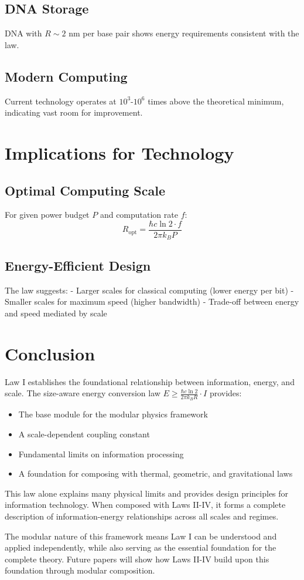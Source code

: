 \documentclass[11pt,a4paper]{article}
\theoremstyle{definition}
\begin{document}
\subsection{DNA Storage}
DNA with $R \sim 2$ nm per base pair shows energy requirements consistent with the law.

\subsection{Modern Computing}
Current technology operates at $10^3$-$10^6$ times above the theoretical minimum, indicating vast room for improvement.

\section{Implications for Technology}

\subsection{Optimal Computing Scale}

For given power budget $P$ and computation rate $f$:
\begin{equation}
R_{\text{opt}} = \frac{\hbar c \ln 2 \cdot f}{2\pi k_B P}
\end{equation}

\subsection{Energy-Efficient Design}

The law suggests:
- Larger scales for classical computing (lower energy per bit)
- Smaller scales for maximum speed (higher bandwidth)
- Trade-off between energy and speed mediated by scale

\section{Conclusion}

Law I establishes the foundational relationship between information, energy, and scale. The size-aware energy conversion law $E \geq \frac{\hbar c \ln 2}{2\pi k_B R} \cdot I$ provides:

\begin{itemize}
\item The base module for the modular physics framework
\item A scale-dependent coupling constant
\item Fundamental limits on information processing
\item A foundation for composing with thermal, geometric, and gravitational laws
\end{itemize}

This law alone explains many physical limits and provides design principles for information technology. When composed with Laws II-IV, it forms a complete description of information-energy relationships across all scales and regimes.

The modular nature of this framework means Law I can be understood and applied independently, while also serving as the essential foundation for the complete theory. Future papers will show how Laws II-IV build upon this foundation through modular composition.
\end{document}
